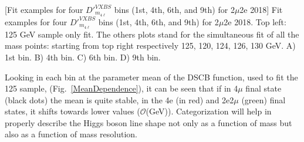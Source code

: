 \begin{multiFigure}
    \begin{center}
        [Fit examples for four $D'^{VXBS}_{m_{4\ell}}$ bins (1st, 4th, 6th, and 9th) 
        for 2$\mu$2e 2018]
        {Fit examples for four $D'^{VXBS}_{m_{4\ell}}$ bins (1st, 4th, 6th, and 9th) 
        for 2$\mu$2e 2018. Top left: 125 GeV sample only fit. The others plots stand for the simultaneous 
        fit of all the mass points: starting from top right respectively 125, 120, 124, 126, 130 GeV.
        \;A) 1st bin.
        \;B) 4th bin.
        \;C) 6th bin.
        \;D) 9th bin. %
        }
    \label{signal_lineshape_2018_2mu2e}
    \end{center}
\end{multiFigure}
Looking in each bin at the parameter mean of the DSCB function, used to fit the 125 \GeV sample, 
(Fig.~\ref{MeanDependence}), it can be seen that if in 4$\mu$ final state (black dots) the mean
is quite stable, in the 4e (in red) and 2e2$\mu$ (green) final states, it shifts towards lower values
($\mathcal{O}$({GeV})). Categorization will help in properly describe the Higgs boson line shape
not only as a function of mass but also as a function of mass resolution.

